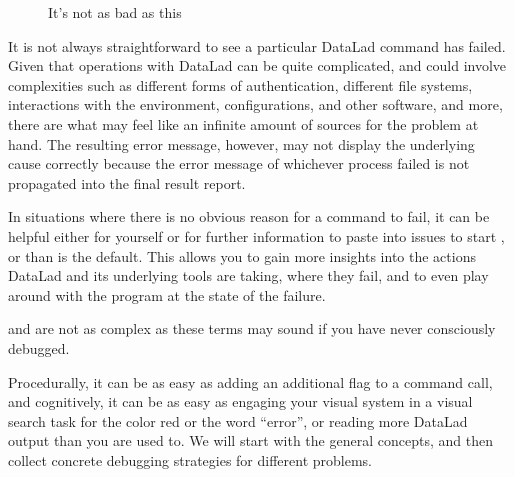 \begin{figure}[tbp]
\centering
\capstart

\noindent{}
\caption{It’s not as bad as this}\label{\detokenize{basics/101-135-help:id4}}\end{figure}

\sphinxAtStartPar
It is not always straightforward to see  a particular DataLad command has failed.
Given that operations with DataLad can be quite complicated, and could involve complexities such as different forms of authentication, different file systems, interactions with the environment, configurations, and other software, and  more, there are what may feel like an infinite amount of sources for the problem at hand.
The resulting error message, however, may not display the underlying cause correctly because the error message of whichever process failed is not propagated into the final result report.

\sphinxAtStartPar
In situations where there is no obvious reason for a command to fail, it can be helpful \textendash{} either for yourself or for further information to paste into {\hyperref[\detokenize{glossary:term-GitHub}]{}} issues \textendash{} to start , or  than is the default.
This allows you to gain more insights into the actions DataLad and its underlying tools are taking, where  they fail, and to even play around with the program at the state of the failure.

\sphinxAtStartPar
{\hyperref[\detokenize{glossary:term-debugging}]{}} and {\hyperref[\detokenize{glossary:term-logging}]{}} are not as complex as these terms may sound if you have never consciously debugged.

\sphinxAtStartPar
Procedurally, it can be as easy as adding an additional flag to a command call, and cognitively, it can be as easy as engaging your visual system in a visual search task for the color red or the word “error”, or reading more DataLad output than you are used to.
We will start with the general concepts, and then collect concrete debugging strategies for different problems.


